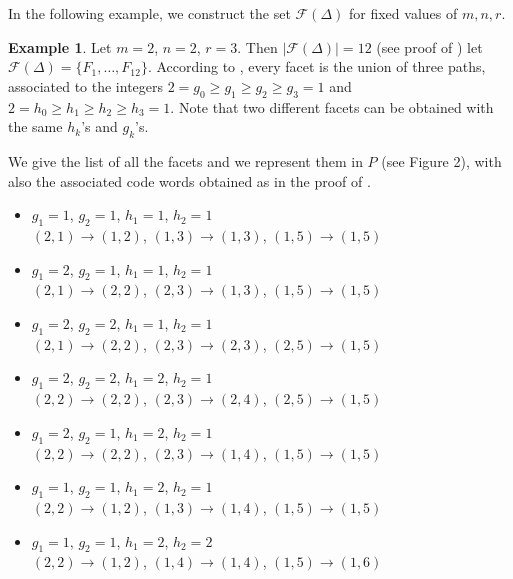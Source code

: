 \documentclass[12pt]{amsart}
\numberwithin{equation}{section}
\theoremstyle{definition}
\newtheorem{example}[theorem]{Example}
\begin{document}
In the following example, we construct the set $\mathcal{F}(\Delta)$ for fixed values of $m,n,r$.
\begin{example}
Let $m=2$, $n=2$, $r=3$. Then $|\mathcal{F}(\Delta)|=12$ (see proof of ) let $\mathcal{F}(\Delta)=\{F_1,\ldots,F_{12}\}$. According to , every facet is the union of three paths, associated to the integers $ 2=g_0\geq g_1 \geq g_2\geq g_3=1$ and $ 2=h_0\geq h_1 \geq h_2\geq h_3=1$. Note that two different facets can be obtained with the same $h_k$'s and $g_k$'s.


We give the list of all the facets and we represent them in $P$ (see Figure 2), with also the associated code words obtained as in the proof of . 
\begin{itemize}
    \item[{$F_1,F_2$ :}]  $g_1=1$, $g_2=1$, $h_1=1$, $h_2=1$\\
    $(2,1)\rightarrow (1,2)$, $(1,3)\rightarrow (1,3)$, $(1,5)\rightarrow (1,5)$ 
    \smallskip
    
    \item[{$F_3$} :] $g_1=2$, $g_2=1$, $h_1=1$, $h_2=1$ \\
     $(2,1)\rightarrow (2,2)$, $(2,3)\rightarrow (1,3)$, $(1,5)\rightarrow (1,5)$
      \smallskip
      
     \item[{$F_4$} :] $g_1=2$, $g_2=2$, $h_1=1$, $h_2=1$\\
      $(2,1)\rightarrow (2,2)$, $(2,3)\rightarrow (2,3)$,  $(2,5)\rightarrow (1,5)$
       \smallskip
       
     \item[{$F_5$} :] $g_1=2$, $g_2=2$, $h_1=2$, $h_2=1$\\
      $(2,2)\rightarrow (2,2)$,  $(2,3)\rightarrow (2,4)$,  $(2,5)\rightarrow (1,5)$ 
       \smallskip

     \item[{$F_6,F_7$} :] $g_1=2$, $g_2=1$, $h_1=2$, $h_2=1$\\
       $(2,2)\rightarrow (2,2)$,  $(2,3)\rightarrow (1,4)$,  $(1,5)\rightarrow (1,5)$
        \smallskip
        
      \item[{$F_8$} :] $g_1=1$, $g_2=1$, $h_1=2$, $h_2=1$\\
       $(2,2)\rightarrow (1,2)$,  $(1,3)\rightarrow (1,4)$,  $(1,5)\rightarrow (1,5)$
        \smallskip
        
      \item[{$F_9$} :] $g_1=1$, $g_2=1$, $h_1=2$, $h_2=2$\\
        $(2,2)\rightarrow (1,2)$,  $(1,4)\rightarrow (1,4)$,  $(1,5)\rightarrow (1,6)$
         \smallskip
         

\end{itemize}
\end{example}
\end{document}
